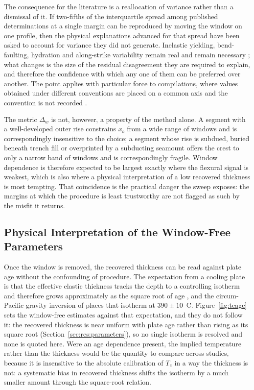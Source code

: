 \documentclass[final]{agujournal2019}
\begin{document}
The consequence for the literature is a reallocation of variance rather than a
dismissal of it. If two-fifths of the interquartile spread among published determinations at a
single margin can be reproduced by moving the window on one profile, then the
physical explanations advanced for that spread have been asked to account for
variance they did not generate. Inelastic yielding, bend-faulting, hydration and
along-strike variability remain real and remain necessary
\cite{ContrerasReyes2007,Craig2014,KaoChen1996,MoscosoContrerasReyes2012}; what
changes is the size of the residual disagreement they are required to explain,
and therefore the confidence with which any one of them can be preferred over
another. The point applies with particular force to compilations, where values
obtained under different conventions are placed on a common axis and the
convention is not recorded \cite{BryWhite2007,Manriquez2014}.

The metric $\Delta_{w}$ is not, however, a property of the method alone. A
segment with a well-developed outer rise constrains $x_{b}$ from a wide range of
windows and is correspondingly insensitive to the choice; a segment whose rise
is subdued, buried beneath trench fill or overprinted by a subducting seamount
offers the crest to only a narrow band of windows and is correspondingly
fragile. Window dependence is therefore expected to be largest exactly where the
flexural signal is weakest, which is also where a physical interpretation of a
low recovered thickness is most tempting. That coincidence is the practical
danger the sweep exposes: the margins at which the procedure is least
trustworthy are not flagged as such by the misfit it returns.

\subsection{Physical Interpretation of the Window-Free Parameters}\label{sec:disc:physics}

Once the window is removed, the recovered thickness can be read against plate
age without the confounding of procedure. The expectation from a cooling plate
is that the effective elastic thickness tracks the depth to a controlling
isotherm and therefore grows approximately as the square root of age
\cite{SteinStein1992,ParsonsSclater1977,CalmantCazenave1987}, and the
circum-Pacific gravity inversion of  places that isotherm
at $390 \pm 10$~\textdegree C. Figure~\ref{fig:teage} sets the window-free
estimates against that expectation, and they do not follow it: the recovered
thickness is near uniform with plate age rather than rising as its square root
(Section~\ref{sec:res:parameters}), so no single isotherm is resolved and none
is quoted here. Were an age dependence present, the implied temperature rather
than the thickness would be the quantity to compare across studies, because it
is insensitive to the absolute calibration of $T_{e}$ in a way the thickness is
not: a systematic bias in recovered thickness shifts the isotherm by a much
smaller amount through the
square-root relation.
\end{document}
